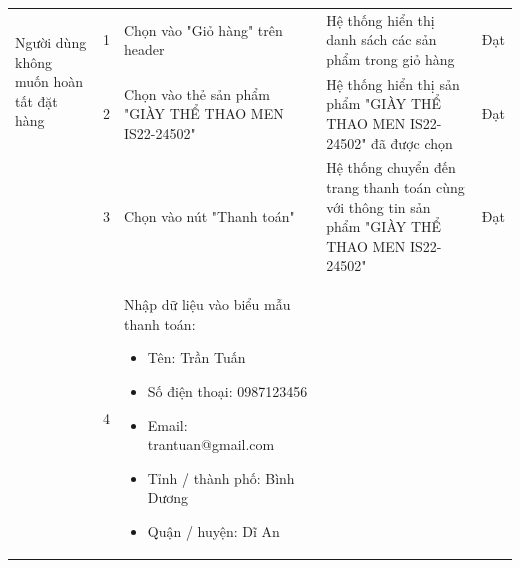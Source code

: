 {\begin{longtable}{| p{2.5cm}| p{1cm}| p{5.5cm}| p{4.5cm} | p{1.5cm} |}
        \hline
        \multirow[t]{2}{2.5cm}{Người dùng không muốn hoàn tất đặt hàng}                                 &
        1                                                                                               &
        Chọn vào "Giỏ hàng" trên header                                                                 &
        Hệ thống hiển thị danh sách các sản phẩm trong giỏ hàng                                         &
        Đạt                                                                                                                                                                                            \\
        \cline{2-5}
                                                                                                        & 2                  &
        Chọn vào thẻ sản phẩm "GIÀY THỂ THAO MEN IS22-24502"                                            &
        Hệ thống hiển thị sản phẩm "GIÀY THỂ THAO MEN IS22-24502" đã được chọn                          &
        Đạt                                                                                                                                                                                            \\
        \cline{2-5}
                                                                                                        & 3                  &
        Chọn vào nút "Thanh toán"                                                                       &
        Hệ thống chuyển đến trang thanh toán cùng với thông tin sản phẩm "GIÀY THỂ THAO MEN IS22-24502" &
        Đạt                                                                                                                                                                                            \\
        \cline{2-5}
                                                                                                        & 4                  &
        Nhập dữ liệu vào biểu mẫu thanh toán:
        \begin{itemize}
            \item Tên: Trần Tuấn
            \item Số điện thoại: 0987123456
            \item Email: trantuan@gmail.com
            \item Tỉnh / thành phố: Bình Dương
            \item Quận / huyện: Dĩ An

\end{itemize}
\end{longtable}}

